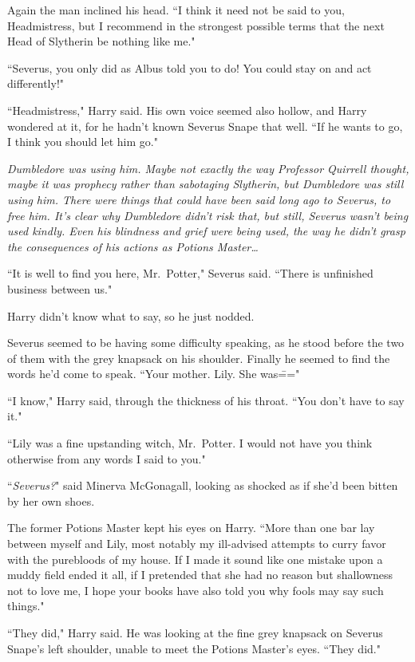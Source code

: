 Again the man inclined his head. ``I think it need not be said to you, Headmistress, but I recommend in the strongest possible terms that the next Head of Slytherin be nothing like me."

``Severus, you only did as Albus told you to do! You could stay on and act differently!"

``Headmistress," Harry said. His own voice seemed also hollow, and Harry wondered at it, for he hadn't known Severus Snape that well. ``If he wants to go, I think you should let him go."

\emph{Dumbledore was using him. Maybe not exactly the way Professor Quirrell thought, maybe it was prophecy rather than sabotaging Slytherin, but Dumbledore was still using him. There were things that could have been said long ago to Severus, to free him. It's clear why Dumbledore didn't risk that, but still, Severus wasn't being used kindly. Even his blindness and grief were being used, the way he didn't grasp the consequences of his actions as Potions Master{\ldots}}

``It is well to find you here, Mr.~Potter," Severus said. ``There is unfinished business between us."

Harry didn't know what to say, so he just nodded.

Severus seemed to be having some difficulty speaking, as he stood before the two of them with the grey knapsack on his shoulder. Finally he seemed to find the words he'd come to speak. ``Your mother. Lily. She was\==="

``I know," Harry said, through the thickness of his throat. ``You don't have to say it."

``Lily was a fine upstanding witch, Mr.~Potter. I would not have you think otherwise from any words I said to you."

``\emph{Severus?}" said Minerva McGonagall, looking as shocked as if she'd been bitten by her own shoes.

The former Potions Master kept his eyes on Harry. ``More than one bar lay between myself and Lily, most notably my ill-advised attempts to curry favor with the purebloods of my house. If I made it sound like one mistake upon a muddy field ended it all, if I pretended that she had no reason but shallowness not to love me, I hope your books have also told you why fools may say such things."

``They did," Harry said. He was looking at the fine grey knapsack on Severus Snape's left shoulder, unable to meet the Potions Master's eyes. ``They did."

